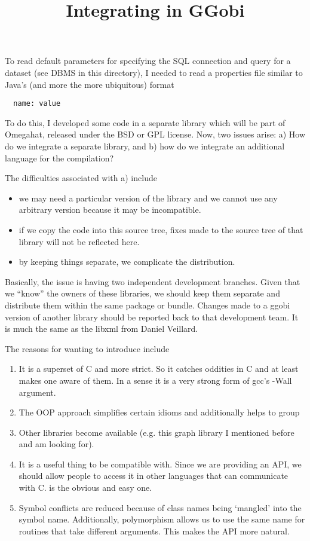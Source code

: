 \documentclass{article}
\title{Integrating \Cplus{} in GGobi}
\begin{document}
\maketitle
To read default parameters for specifying the SQL connection and query
for a dataset (see DBMS in this directory), I needed to read a
properties file similar to Java's (and more the more ubiquitous)
format
\begin{verbatim}
  name: value
\end{verbatim}
To do this, I developed some \Cplus{} code in a separate library which
will be part of Omegahat, released under the BSD or GPL license.
Now, two issues arise: a) How do we integrate
a separate library, and b) how do we integrate an
additional language for the compilation?

The difficulties associated with a)  include
\begin{itemize}
\item we may need a particular version of the library
and we cannot use any arbitrary version
because it may be incompatible.
\item if we copy the code into this source tree,
fixes made to the source tree of that library will not
be reflected here.
\item by keeping things separate, we complicate 
the distribution.
\end{itemize}
Basically, the issue is having two independent development branches.
Given that we ``know'' the owners of these libraries, we should keep
them separate and distribute them within the same package or bundle.
Changes made to a ggobi version of another library should be reported
back to that development team.  It is much the same as the libxml from
Daniel Veillard.


The reasons for wanting to introduce \Cplus{} include
\begin{enumerate}
\item It is a superset of C and more strict.  So it catches oddities
in C and at least makes one aware of them.  In a sense it is a very
strong form of gcc's -Wall argument.
\item The OOP approach simplifies certain
idioms and additionally helps to group
\item Other libraries become available (e.g. this graph library
I mentioned before and am looking for).
\item It is a useful thing to be compatible with.  Since we are
providing an API, we should allow people to access it in other
languages that can communicate with C.  \Cplus{} is the obvious and
easy one.
\item Symbol conflicts are reduced because of class names being
`mangled' into the symbol name.  Additionally, polymorphism allows us
to use the same name for routines that take different arguments. This
makes the API more natural.
\end{enumerate}
\end{document}

